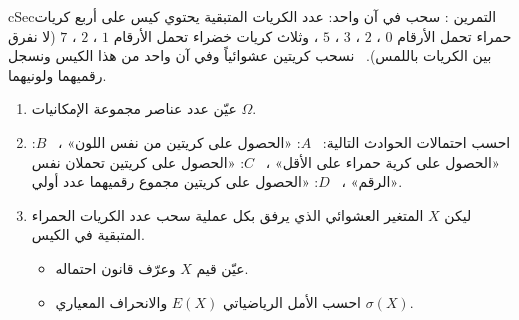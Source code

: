\documentclass[12pt,a4paper]{article}
\newenvironment{BOX}[2]{\begin{otherlanguage}{english}\begin{arbox}{#1}{#2}}{\end{arbox}\end{otherlanguage}}
\newcounter{exo}
\newenvironment{tamrin}[1]{\stepcounter{exo}\begin{BOX}{cSec}{التمرين \theexo: #1}}{\end{BOX}}
\newenvironment{sq}{\begin{itemize}[leftmargin=2.4em,itemsep=3pt]}{\end{itemize}}
\newcommand{\qa}{\item[(أ)]}\newcommand{\qb}{\item[(ب)]}\newcommand{\qc}{\item[(جـ)]}\newcommand{\qd}{\item[(د)]}\newcommand{\qe}{\item[(هـ)]}
\begin{document}
\begin{tamrin}{سحب في آن واحد: عدد الكريات المتبقية}
يحتوي كيس على أربع كريات حمراء تحمل الأرقام $0$ ، $2$ ، $3$ ، $5$ ، وثلاث كريات خضراء تحمل الأرقام $1$ ، $2$ ، $7$ (لا نفرق بين الكريات باللمس). \ نسحب كريتين عشوائياً وفي آن واحد من هذا الكيس ونسجل رقميهما ولونيهما.
\begin{enumerate}
\item عيّن عدد عناصر مجموعة الإمكانيات $\Omega$.
\item احسب احتمالات الحوادث التالية: \ $A$: «الحصول على كريتين من نفس اللون» ، \ $B$: «الحصول على كرية حمراء على الأقل» ، \ $C$: «الحصول على كريتين تحملان نفس الرقم» ، \ $D$: «الحصول على كريتين مجموع رقميهما عدد أولي».
\item ليكن $X$ المتغير العشوائي الذي يرفق بكل عملية سحب عدد الكريات الحمراء المتبقية في الكيس.
\begin{sq}
\qa عيّن قيم $X$ وعرّف قانون احتماله.
\qb احسب الأمل الرياضياتي $E(X)$ والانحراف المعياري $\sigma(X)$.
\end{sq}
\end{enumerate}
\end{tamrin}
\end{document}
